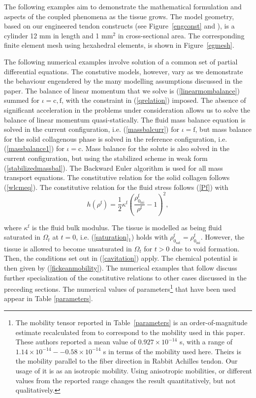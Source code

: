 The following examples aim to demonstrate the mathematical formulation
and aspects of the coupled phenomena as the tissue grows. The model
geometry, based on our engineered tendon constructs (see
Figure~\ref{engconst} and \citet{Calve:04}), is a cylinder 12 mm in length and 1 mm$^2$ in
cross-sectional area. The corresponding finite element mesh using
hexahedral elements, is shown in Figure~\ref{egmesh}.

The following numerical examples involve solution of a common set of
partial differential equations. The constutive models, however, vary as we
demonstrate the behaviour engendered by the many modelling
assumptions discussed in the paper. The balance of linear momentum
that we solve is (\ref{linearmombalance}) summed for $\iota =
\mathrm{c,f}$, with the constraint in (\ref{qrelation}) imposed. The
absence of significant acceleration in the problems under 
consideration allows us to solve the balance of linear momentum   
quasi-statically. The fluid mass balance equation is solved in the current
configuration, i.e. (\ref{massbalcurr}) for $\iota = \mathrm{f}$, but 
mass balance for the solid collagenous phase is solved in the
reference configuration, i.e. (\ref{massbalance1}) for $\iota =
\mathrm{c}$.  Mass balance for the solute is also solved in the
current configuration, but using the stabilized scheme in weak
form (\ref{stabilizedmassbal}). The Backward 
Euler algorithm is used for all mass transport equations. The
constitutive relation for the solid collagen follows
(\ref{wlcmeq}). The constitutive relation for the fluid stress follows
(\ref{Pf}) with 
\begin{equation}
h(\rho^\mathrm{f}) =
\frac{1}{2}\kappa^\mathrm{f}\left(\frac{\rho_{0_\mathrm{ini}}^\mathrm{f}}{\rho^\mathrm{f}}
- 1\right)^2,
\end{equation}

\noindent where $\kappa^\mathrm{f}$ is the fluid bulk modulus. The
tissue is modelled as being fluid saturated in $\Omega_t$ at $t = 0$,
i.e. (\ref{saturation}$_1$) holds with
$\rho^\mathrm{f}_{0_\mathrm{sat}} =
\rho^\mathrm{f}_{0_\mathrm{ini}}$. However, the tissue is allowed to 
become unsaturated in $\Omega_t$ for $t > 0$ due to void formation. Then,
the conditions set out in (\ref{cavitation})
apply. The chemical potential is then given by
(\ref{fickeanmobility}). The numerical examples that follow discuss further
specialization of the constitutive relations to other cases discussed
in the preceding sections. The numerical values of parameters\footnote{The
  mobility tensor reported in Table~\ref{parameters} is an
  order-of-magnitude estimate 
  recalculated from \citet{Hanetal:2000} to correspond to the 
  mobility used in this paper. These authors reported a mean value of
  $0.927\times 10^{-14}$ s, with a range of $1.14\times
  10^{-14}--0.58\times 10^{-14}$ s in terms of the mobility used
  here. Theirs is the mobility parallel to the fiber direction in
  Rabbit Achilles tendon. Our usage of it is as an isotropic
  mobility. Using anisotropic mobilities, or different values from the
  reported range changes the result
  quantitatively, but not qualitatively.}  that
have been used appear in Table \ref{parameters}.



